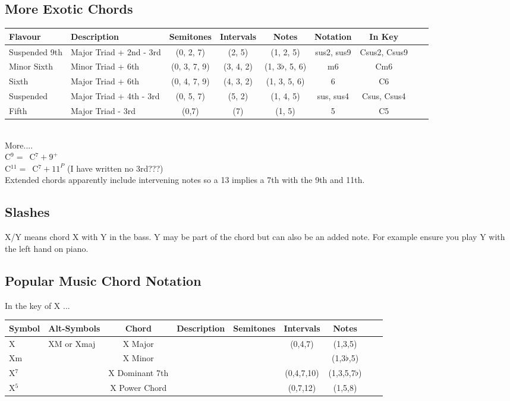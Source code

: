 \documentclass[a4paper]{scrartcl}
\begin{document}
\subsection{More Exotic Chords}
\begin{tabular}
{| l | l | c | c | c | c | c | c | c |} \hline
Flavour & Description & Semitones & Intervals & Notes & Notation & In Key \\ \hline
Suspended 9th & Major Triad + 2nd - 3rd & (0, 2, 7) & (2, 5) & (1, 2, 5) & sus2, sus9 & Csus2, Csus9 \\ \hline
Minor Sixth & Minor Triad + 6th & (0, 3, 7, 9) & (3, 4, 2) & (1, 3$\flat$, 5, 6) & m6 & Cm6 \\ \hline
Sixth & Major Triad + 6th & (0, 4, 7, 9) & (4, 3, 2) & (1, 3, 5, 6) & 6 & C6 \\ \hline
Suspended & Major Triad + 4th - 3rd & (0, 5, 7) & (5, 2) & (1, 4, 5) & sus, sus4 & Csus, Csus4 \\ \hline
Fifth & Major Triad - 3rd & (0,7) & (7) & (1, 5) & 5 & C5 \\ \hline

\end{tabular} \\
More....\\
C$^{9} = $\ C$^{7} + 9^{+}$\\
C$^{11} = $\ C$^{7} + 11^{P}$ (I have written no 3rd???) \\

Extended chords apparently include intervening notes so a 13 implies a 7th with the 9th and 11th.

\subsection{Slashes}
X/Y means chord X with Y in the bass. Y may be part of the chord but can also be an added note. For example ensure you play Y with the left hand on piano.


\subsection{Popular Music Chord Notation}
In the key of X ... \\
\begin{tabular}
{| l | l | c | c | c | c | c | c | c |} \hline
Symbol & Alt-Symbols & Chord & Description & Semitones & Intervals & Notes \\ \hline
X & XM or Xmaj & X Major & & & (0,4,7) & (1,3,5) \\ \hline
Xm & & X Minor & & & & (1,3$\flat$,5) \\ \hline
X$^7$ & & X Dominant 7th & & & (0,4,7,10) & (1,3,5,7$\flat$) \\ \hline
X$^5$ & & X Power Chord & & & (0,7,12) & (1,5,8) \\ \hline


\end{tabular} \\
\end{document}
